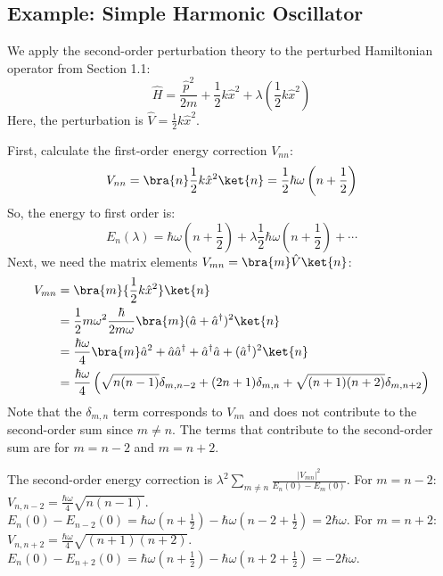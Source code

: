 \subsection{Example: Simple Harmonic Oscillator}
\begin{example}
  We apply the second-order perturbation theory to the perturbed
  Hamiltonian operator from Section 1.1:
  \begin{equation} \label{eq:sho_perturbed_H_lambda_V}
    \hat H = \frac{\hat p^2 }{2m} + \frac{1}{2}k\hat x^2 +
    \lambda \left(\frac{1}{2} k \hat x^2\right)
  \end{equation}
  Here, the perturbation is $\hat V = \frac{1}{2}k \hat x^2$.

  First, calculate the first-order energy correction $V_{nn}$:
  \begin{equation} \label{eq:sho_v_nn}
    V_{nn} = \bra{n}\frac{1}{2}k \hat x^2\ket{n} = \frac{1}{2}
    \hbar \omega \left(n + \frac{1}{2}\right)
  \end{equation}
  So, the energy to first order is:
  \begin{equation} \label{eq:sho_energy_first_order}
    E_n (\lambda) = \hbar \omega \left (n + \frac{1}{2}\right) +
    \lambda \frac{1}{2} \hbar \omega \left(n + \frac{1}{2}\right) + \cdots
  \end{equation}
  Next, we need the matrix elements $V_{mn} = \bra{m}\hat V\ket{n}$:
  \begin{align} \label{eq:sho_v_mn}
    V_{mn} &= \bra{m}{\frac{1}{2}k \hat x^2}\ket{n} \\
    &= \frac{1}{2} m \omega^2 \frac{\hbar}{2m\omega} \bra{m}(\hat
    a + \hat a^\dagger)^2 \ket{n} \notag \\
    &= \frac{\hbar \omega}{4} \bra{m}\hat a^2 + \hat a \hat
    a^\dagger + \hat a^\dagger \hat a + (\hat a^\dagger)^2 \ket{n} \notag \\
    &= \frac{\hbar \omega}{4} \left( \sqrt{n(n-1)}\delta_{m, n-2}
    + (2n+1)\delta_{m,n} + \sqrt{(n+1)(n+2)}\delta_{m,n+2}\right) \notag
  \end{align}
  Note that the $\delta_{m,n}$ term corresponds to $V_{nn}$ and
  does not contribute to the second-order sum since $m \ne n$. The
  terms that contribute to the second-order sum are for $m=n-2$ and $m=n+2$.

  The second-order energy correction is $\lambda^2 \sum_{m \ne n}
  \frac{|V_{mn}|^2}{E_n(0) - E_m(0)}$.
  For $m=n-2$: $V_{n,n-2} = \frac{\hbar \omega}{4}\sqrt{n(n-1)}$.
  $E_n(0) - E_{n-2}(0) = \hbar\omega(n+\frac{1}{2}) -
  \hbar\omega(n-2+\frac{1}{2}) = 2\hbar\omega$.
  For $m=n+2$: $V_{n,n+2} = \frac{\hbar
  \omega}{4}\sqrt{(n+1)(n+2)}$. $E_n(0) - E_{n+2}(0) =
  \hbar\omega(n+\frac{1}{2}) - \hbar\omega(n+2+\frac{1}{2}) = -2\hbar\omega$.


\end{example}
